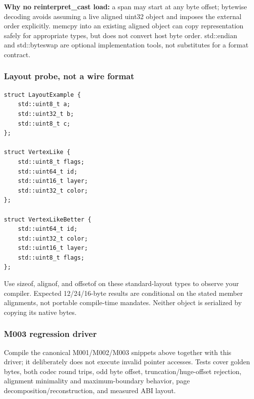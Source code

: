 \textbf{Why no reinterpret\_cast load:} a span may start at any byte offset; bytewise decoding avoids assuming a live aligned uint32 object and imposes the external order explicitly. memcpy into an existing aligned object can copy representation safely for appropriate types, but does not convert host byte order. std::endian and std::byteswap are optional implementation tools, not substitutes for a format contract.

\subsubsection{Layout probe, not a wire format}\label{appendix-4e2236f53445-layout-probe-not-a-wire-format}

\begin{verbatim}
struct LayoutExample {
    std::uint8_t a;
    std::uint32_t b;
    std::uint8_t c;
};

struct VertexLike {
    std::uint8_t flags;
    std::uint64_t id;
    std::uint16_t layer;
    std::uint32_t color;
};

struct VertexLikeBetter {
    std::uint64_t id;
    std::uint32_t color;
    std::uint16_t layer;
    std::uint8_t flags;
};
\end{verbatim}

Use sizeof, alignof, and offsetof on these standard-layout types to observe your compiler. Expected 12/24/16-byte results are conditional on the stated member alignments, not portable compile-time mandates. Neither object is serialized by copying its native bytes.

\subsubsection{M003 regression driver}\label{appendix-4e2236f53445-m003-regression-driver}

Compile the canonical M001/M002/M003 snippets above together with this driver; it deliberately does not execute invalid pointer accesses. Tests cover golden bytes, both codec round trips, odd byte offset, truncation/huge-offset rejection, alignment minimality and maximum-boundary behavior, page decomposition/reconstruction, and measured ABI layout.

